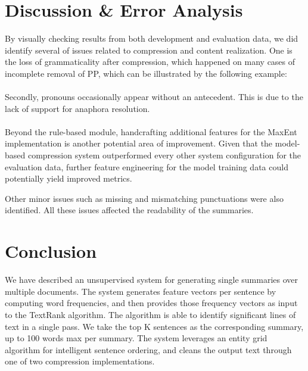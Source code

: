\documentclass[11pt]{article}
\begin{document}
\section{Discussion \& Error Analysis}

By visually checking results from both development and evaluation data, we did identify several of issues related to compression and content realization. One is the loss of grammaticality after compression, which happened on many cases of incomplete removal of PP, which can be illustrated by the following example:
\\

\\ 

Secondly, pronouns occasionally appear without an antecedent. This is due to the lack of support for anaphora resolution. 
\\

\\

Beyond the rule-based module, handcrafting additional features for the MaxEnt implementation is another potential area of improvement. Given that the model-based compression system outperformed every other system configuration for the evaluation data, further feature engineering for the model training data could potentially yield improved metrics.

Other minor issues such as missing and mismatching punctuations were also identified. All these issues affected the readability of the summaries.


\section{Conclusion}
 We have described an unsupervised system for generating single summaries over multiple documents. The system generates feature vectors per sentence by computing word frequencies, and then provides those frequency vectors as input to the TextRank algorithm. The algorithm is able to identify significant lines of text in a single pass. We take the top K sentences as the corresponding summary, up to 100 words max per summary. The system leverages an entity grid algorithm for intelligent sentence ordering, and cleans the output text through one of two compression implementations.
\end{document}
